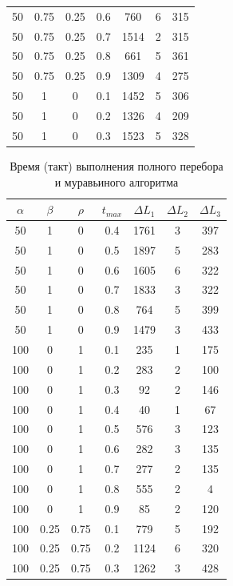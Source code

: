 \documentclass[a4paper,oneside,14pt]{extreport}
\begin{document}
\begin{table}[h]
\begin{center}
\begin{tabular}{|c|c|c|c|c|c|c|}
		 50 & 0.75 & 0.25 & 0.6 & 760 & 6 & 315 \\
		 50 & 0.75 & 0.25 & 0.7 & 1514 & 2 & 315 \\
		 50 & 0.75 & 0.25 & 0.8 & 661 & 5 & 361 \\
		 50 & 0.75 & 0.25 & 0.9 & 1309 & 4 & 275 \\
		 50 & 1 & 0 & 0.1 & 1452 & 5 & 306 \\
		 50 & 1 & 0 & 0.2 & 1326 & 4 & 209 \\
		 50 & 1 & 0 & 0.3 & 1523 & 5 & 328 \\
		 \hline
	\end{tabular}
\end{center}
\end{table}
\newpage 

\begin{table}[h]
\caption{Время (такт) выполнения полного перебора и муравьиного алгоритма}
\label{tbl:only}
\begin{center}
	\begin{tabular}{|c|c|c|c|c|c|c|}
		\hline
		$\alpha$ & $\beta$ & $\rho$ &  $t_{max}$ & $\Delta L_{1}$ & $\Delta L_{2}$ & $\Delta L_{3}$\\
		\hline
		50 & 1 & 0 & 0.4 & 1761 & 3 & 397 \\
		50 & 1 & 0 & 0.5 & 1897 & 5 & 283 \\
		50 & 1 & 0 & 0.6 & 1605 & 6 & 322 \\
		50 & 1 & 0 & 0.7 & 1833 & 3 & 322 \\
		50 & 1 & 0 & 0.8 & 764 & 5 & 399 \\
		50 & 1 & 0 & 0.9 & 1479 & 3 & 433 \\
		100 & 0 & 1 & 0.1 & 235 & 1 & 175 \\
		100 & 0 & 1 & 0.2 & 283 & 2 & 100 \\
		100 & 0 & 1 & 0.3 & 92 & 2 & 146 \\
		100 & 0 & 1 & 0.4 & 40 & 1 & 67 \\
		100 & 0 & 1 & 0.5 & 576 & 3 & 123 \\
		100 & 0 & 1 & 0.6 & 282 & 3 & 135 \\
		100 & 0 & 1 & 0.7 & 277 & 2 & 135 \\
		100 & 0 & 1 & 0.8 & 555 & 2 & 4 \\
		100 & 0 & 1 & 0.9 & 85 & 2 & 120 \\
		100 & 0.25 & 0.75 & 0.1 & 779 & 5 & 192 \\
		100 & 0.25 & 0.75 & 0.2 & 1124 & 6 & 320 \\
		100 & 0.25 & 0.75 & 0.3 & 1262 & 3 & 428 \\

\end{tabular}
\end{center}
\end{table}
\end{document}
